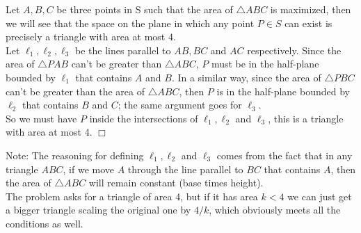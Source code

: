 \begin{solution}
    Let $A,B,C$ be three points in S such that the area of $\triangle ABC$ is maximized, then we will see that the space on the plane in which any point $P \in S$ can exist is precisely a triangle with area at most $4$.\\
    Let $\ell_1,\ell_2,\ell_3$ be the lines parallel to $AB,BC $ and $AC$ respectively.
    Since the area of $\triangle PAB$ can't be greater than $\triangle ABC$, $P$ must be in the half-plane bounded by $\ell_1$ that contains $A$ and $B$. In a similar way, since the area of $\triangle PBC$ can't be greater than the area of $\triangle ABC$, then $P$ is in the half-plane bounded by $\ell_2$ that contains $B$ and $C$; the same argument goes for $\ell_3$.\\
    So we must have $P$ inside the intersections of $\ell_1,\ell_2$ and $\ell_3$, this is a triangle with area at most 4. $\Box$

    \begin{center}
    \end{center}
    Note: The reasoning for defining $\ell_1,\ell_2$ and $\ell_3$ comes from the fact that in any triangle $ABC$, if we move $A$ through the line parallel to $BC$ that contains $A$, then the area of $\triangle ABC$ will remain constant (base times height).\\
    The problem asks for a triangle of area 4, but if it has area $k<4$ we can just get a bigger triangle scaling the original one by $4/k$, which obviously meets all the conditions as well.
\end{solution}

